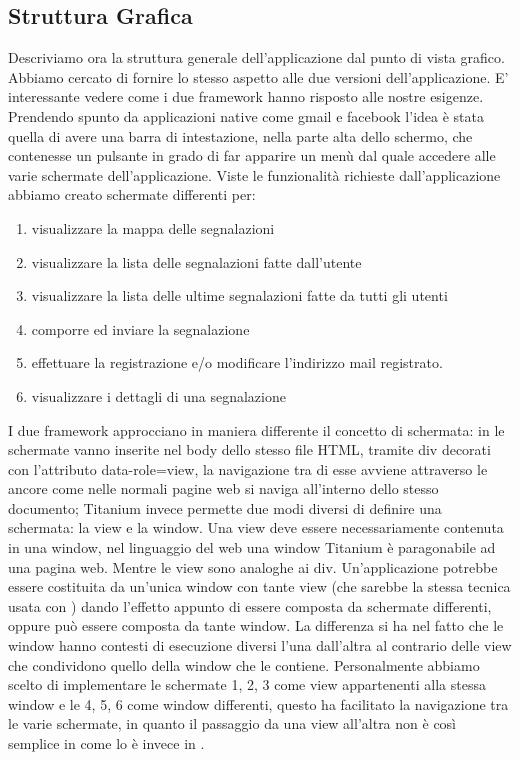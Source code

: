 		\subsection{Struttura Grafica}
		\label{subsec:structgraphic}
			Descriviamo ora la struttura generale dell'applicazione dal punto 
			di vista grafico.
			Abbiamo cercato di fornire lo stesso aspetto alle due versioni 
			dell'applicazione. E' interessante vedere come i due framework hanno risposto 
			alle nostre esigenze. Prendendo spunto da applicazioni native come 
			gmail e facebook l'idea è stata quella di avere una barra di intestazione, 
			nella parte alta dello schermo, che contenesse un pulsante in grado di 
			far apparire un menù dal quale accedere alle varie schermate dell'applicazione.
			Viste le funzionalità richieste dall'applicazione abbiamo creato schermate 
			differenti per:
			\begin{enumerate} 
				\item visualizzare la mappa delle segnalazioni 
				\item visualizzare la lista delle segnalazioni fatte dall'utente
				\item visualizzare la lista delle ultime segnalazioni fatte da tutti gli utenti
				\item comporre ed inviare la segnalazione
				\item effettuare la registrazione e/o modificare l'indirizzo mail registrato.
				\item visualizzare i dettagli di una segnalazione
			\end{enumerate}
			
			I due framework approcciano in maniera differente il concetto di schermata: 
			in \kendomob{} le schermate vanno inserite nel body dello stesso 
			file HTML, tramite div decorati con l'attributo data-role=view, la 
			navigazione tra di esse avviene attraverso le ancore come nelle normali 
			pagine web si naviga all'interno dello stesso documento; Titanium invece 
			permette due modi diversi di definire una schermata: la view e la window.
			Una view deve essere necessariamente contenuta in una window, nel linguaggio 
			del web una window Titanium è paragonabile ad una pagina web. Mentre le view 
			sono analoghe ai div. Un'applicazione potrebbe essere costituita da un'unica 
			window con tante view (che sarebbe la stessa tecnica usata con \kendomob{}) 
			dando l'effetto appunto di essere composta da schermate differenti, oppure 
			può essere composta da tante window. La differenza si ha nel fatto che 
			le window hanno contesti di esecuzione diversi l'una dall'altra al contrario 
			delle view che condividono quello della window che le contiene.
			Personalmente abbiamo scelto di implementare le schermate 1, 2, 3 come 
			view appartenenti alla stessa window e le 4, 5, 6 come window differenti, 
			questo ha facilitato la navigazione tra le varie schermate, in quanto 
			il passaggio da una view all'altra non è così semplice in \tisdk{} come 
			lo è invece in \kendomob{}.
			
